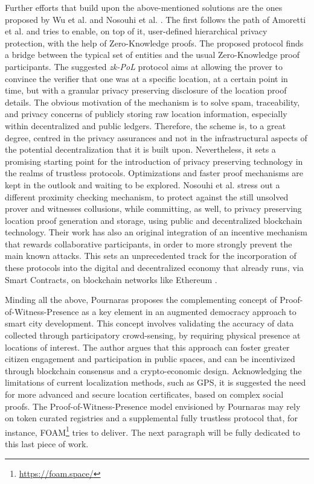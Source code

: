 Further efforts that build upon the above-mentioned solutions are the ones proposed by Wu et al. \cite{wu2020blockchain} and Nosouhi et al. \cite{nosouhi2020blockchain}. The first follows the path of Amoretti et al. \cite{amoretti2018blockchain} and tries to enable, on top of it, user-defined hierarchical privacy protection, with the help of Zero-Knowledge proofs. The proposed protocol finds a bridge between the typical \pol{} set of entities and the usual Zero-Knowledge proof participants. The suggested \emph{zk-PoL} protocol aims at allowing the prover to convince the verifier that one was at a specific location, at a certain point in time, but with a granular privacy preserving disclosure of the location proof details. The obvious motivation of the mechanism is to solve spam, traceability, and privacy concerns of publicly storing raw location information, especially within decentralized and public ledgers. Therefore, the scheme is, to a great degree, centred in the privacy assurances and not in the infrastructural aspects of the potential decentralization that it is built upon. Nevertheless, it sets a promising starting point for the introduction of privacy preserving technology in the realms of trustless \pol{} protocols. Optimizations and faster proof mechanisms are kept in the outlook and waiting to be explored. Nosouhi et al. \cite{nosouhi2020blockchain} stress out a different proximity checking mechanism, to protect against the still unsolved prover and witnesses collusions, while committing, as well, to privacy preserving location proof generation and storage, using public and decentralized blockchain technology. Their work has also an original integration of an incentive mechanism that rewards collaborative participants, in order to more strongly prevent the main known attacks. This sets an unprecedented track for the incorporation of these \pol{} protocols into the digital and decentralized economy that already runs, via Smart Contracts, on blockchain networks like Ethereum \cite{nosouhi2020blockchain, buterin2014next}. 

Minding all the above, Pournaras \cite{pournaras2020proof} proposes the complementing concept of Proof-of-Witness-Presence as a key element in an augmented democracy approach to smart city development. This concept involves validating the accuracy of data collected through participatory crowd-sensing, by requiring physical presence at locations of interest. The author argues that this approach can foster greater citizen engagement and participation in public spaces, and can be incentivized through blockchain consensus and a crypto-economic design. Acknowledging the limitations of current localization methods, such as GPS, it is suggested the need for more advanced and secure location certificates, based on complex social proofs. The Proof-of-Witness-Presence model envisioned by Pournaras may rely on token curated registries and a supplemental fully trustless \pol{} protocol that, for instance, FOAM\footnote{\url{https://foam.space/}} tries to deliver. The next paragraph will be fully dedicated to this last piece of work.

